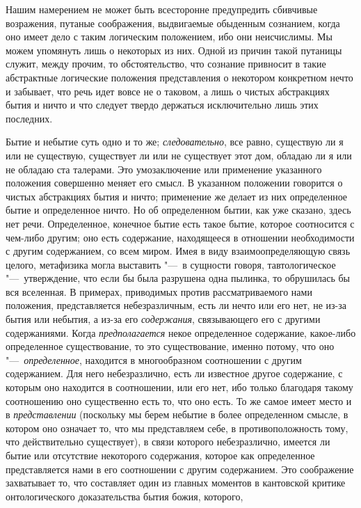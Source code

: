 Нашим намерением не может быть всесторонне предупредить сбивчивые
возражения, путаные соображения, выдвигаемые обыденным сознанием, когда оно
имеет дело с таким логическим положением, ибо они неисчислимы. Мы можем
упомянуть лишь о некоторых из них. Одной из причин такой путаницы служит,
между прочим, то обстоятельство, что сознание привносит в такие абстрактные
логические положения представления о некотором конкретном нечто и забывает,
что речь идет вовсе не о таковом, а лишь о чистых абстракциях бытия и ничто
и что следует твердо держаться исключительно лишь этих последних.

Бытие и небытие суть одно и то же; {\em следовательно},
все равно, существую ли я или не существую, существует ли или не существует
этот дом, обладаю ли я или не обладаю ста талерами. Это умозаключение или
применение указанного положения совершенно меняет его смысл. В указанном
положении говорится о чистых абстракциях бытия и ничто; применение же
делает из них определенное бытие и определенное ничто. Но об определенном
бытии, как уже сказано, здесь нет речи. Определенное, конечное бытие есть
такое бытие, которое соотносится с чем-либо другим; оно есть содержание,
находящееся в отношении необходимости с другим содержанием, со всем миром.
Имея в виду взаимоопределяющую связь целого, метафизика могла выставить "---~в
сущности говоря, тавтологическое "---~утверждение, что если бы была разрушена
одна пылинка, то обрушилась бы вся вселенная. В примерах, приводимых против
рассматриваемого нами положения, представляется небезразличным, есть ли
нечто или его нет, не из-за бытия или небытия, а из-за его
{\em содержания}, связывающего его с другими
содержаниями. Когда {\em предполагается} некое
определенное содержание, какое-либо определенное существование, то это
существование, именно потому, что оно
"---~{\em определенное}, находится в многообразном
соотношении с другим содержанием. Для него небезразлично, есть ли известное
другое содержание, с которым оно находится в соотношении, или его нет, ибо
только благодаря такому соотношению оно существенно есть то, что оно есть.
То же самое имеет место и в {\em представлении}
(поскольку мы берем небытие в более определенном смысле, в котором оно
означает то, что мы представляем себе, в противоположность тому, что
действительно существует), в связи которого небезразлично, имеется ли бытие
или отсутствие некоторого содержания, которое как определенное
представляется нами в его соотношении с другим содержанием.
\label{bkm:bm85a}
Это соображение захватывает то, что составляет один из главных моментов в
кантовской критике онтологического доказательства бытия божия, которого,
